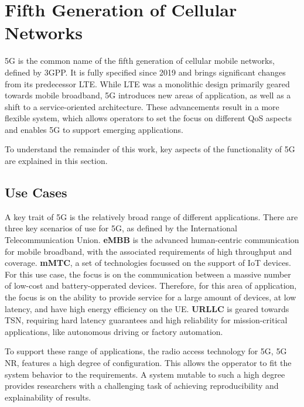 \section{Fifth Generation of Cellular Networks}\label{sec:back:5g}

5G is the common name of the fifth generation of cellular mobile networks, defined by 3GPP.
It is fully specified since 2019 and brings significant changes from its predecessor \gls{LTE}.
While LTE was a monolithic design primarily geared towards mobile broadband, 5G introduces new areas of application,
as well as a shift to a service-oriented architecture.
These advancements result in a more flexible system, which allows operators to set the focus on different \gls{QoS}
aspects and enables 5G to support emerging applications.

To understand the remainder of this work, key aspects of the functionality of 5G are explained in this section.


\subsection{Use Cases}

A key trait of 5G is the relatively broad range of different applications.
There are three key scenarios of use for 5G, as defined by the International Telecommunication Union.\cites{series2017minimum, sachs20185g, zaidi2018ofdm}
\textbf{\Gls{eMBB}} is the advanced human-centric communication for mobile broadband, with the associated requirements of
high throughput and coverage.
\textbf{\Gls{mMTC}}, a set of technologies focussed on the support of \gls{IoT} devices.
For this use case, the focus is on the communication between a massive number of low-cost and battery-opperated devices.
Therefore, for this area of application, the focus is on the ability to provide service for a large
amount of devices, at low latency, and have high energy efficiency on the \gls{UE}.
\textbf{\Gls{URLLC}} is geared towards \gls{TSN}, requiring hard latency guarantees and high reliability for mission-critical applications,
like autonomous driving or factory automation.

To support these range of applications, the radio access technology for 5G, 5G \gls{NR}, features a high degree of configuration.
This allows the opperator to fit the system behavior to the requirements.
A system mutable to such a high degree provides researchers with a challenging task of achieving reproducibility and explainability of results.


